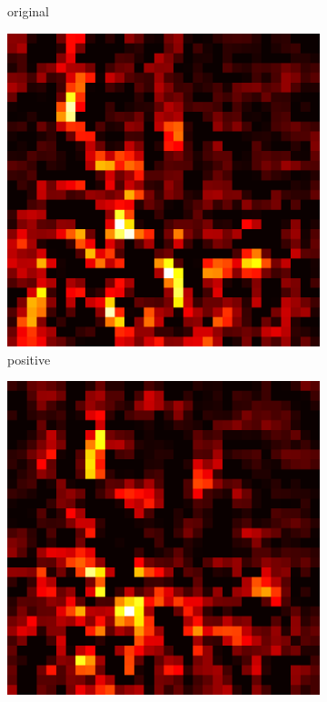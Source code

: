 \documentclass[preprint,12pt]{elsarticle}
\begin{document}
\begin{figure}
\begin{subfigure}{0.14\linewidth}
        \caption{original}
    \end{subfigure}
    \hfill
    \begin{subfigure}{0.14\textwidth}
        \centering
        \includegraphics[width=\linewidth]{../visualizations/examples/cifar10/cnn/positive_saliency_map/8.png}
        \caption{positive}
    \end{subfigure}
    \hfill
    \begin{subfigure}{0.14\textwidth}
        \centering
        \includegraphics[width=\linewidth]{../visualizations/examples/cifar10/cnn/negative_saliency_map/8.png}

\end{subfigure}
\end{figure}
\end{document}
